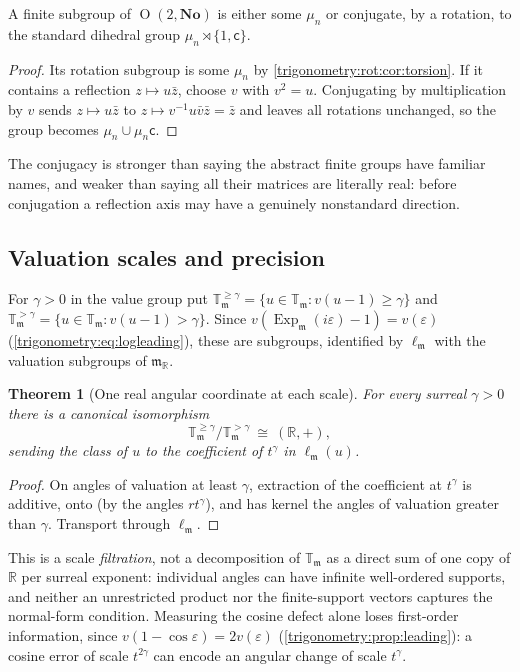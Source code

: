 \documentclass[11pt,letterpaper]{article}
\numberwithin{equation}{section}
\newtheorem{theorem}{Theorem}[section]
\theoremstyle{definition}
\theoremstyle{remark}
\newcommand{\No}{\mathbf{No}}
\newcommand{\R}{\mathbb R}
\newcommand{\mm}{\mathfrak m}
\newcommand{\TT}{\mathbb T}
\newcommand{\eps}{\varepsilon}
\newcommand{\Ex}{\operatorname{Exp}_{\mm}}
\newcommand{\Orth}{\operatorname{O}}
\newcommand{\ellm}{\ell_{\mm}}
\newcommand{\Tm}{\TT_{\mm}}
\begin{document}
\begin{proposition}\label{trigonometry:rot:prop:dihedral}
A finite subgroup of $\Orth(2,\No)$ is either some $\mu_n$ or conjugate, by a rotation, to the
standard dihedral group $\mu_n\rtimes\{1,\mathsf c\}$.
\end{proposition}
\begin{proof}
Its rotation subgroup is some $\mu_n$ by \cref{trigonometry:rot:cor:torsion}. If it contains a
reflection $z\mapsto u\bar z$, choose $v$ with $v^2=u$. Conjugating by multiplication by $v$ sends
$z\mapsto u\bar z$ to $z\mapsto v^{-1}u\bar v\bar z=\bar z$ and leaves all rotations unchanged, so the
group becomes $\mu_n\cup\mu_n\mathsf c$.
\end{proof}
The conjugacy is stronger than saying the abstract finite groups have familiar names, and weaker
than saying all their matrices are literally real: before conjugation a reflection axis may have a
genuinely nonstandard direction.

\subsection{Valuation scales and precision}\label{trigonometry:rot:sec:scales}
For $\gamma>0$ in the value group put
$\Tm^{\ge\gamma}=\{u\in\Tm:v(u-1)\ge\gamma\}$ and $\Tm^{>\gamma}=\{u\in\Tm:v(u-1)>\gamma\}$. Since
$v(\Ex(i\eps)-1)=v(\eps)$ (\cref{trigonometry:eq:logleading}), these are subgroups, identified by
$\ellm$ with the valuation subgroups of $\mm_{\R}$.

\begin{theorem}[One real angular coordinate at each scale]\label{trigonometry:rot:thm:graded}
For every surreal $\gamma>0$ there is a canonical isomorphism
\begin{equation}\label{trigonometry:rot:eq:graded}
 \Tm^{\ge\gamma}/\Tm^{>\gamma}\ \cong\ (\R,+),
\end{equation}
sending the class of $u$ to the coefficient of $t^\gamma$ in $\ellm(u)$.
\end{theorem}
\begin{proof}
On angles of valuation at least $\gamma$, extraction of the coefficient at $t^\gamma$ is additive,
onto (by the angles $rt^\gamma$), and has kernel the angles of valuation greater than $\gamma$.
Transport through $\ellm$.
\end{proof}
This is a scale \emph{filtration}, not a decomposition of $\Tm$ as a direct sum of one copy of $\R$
per surreal exponent: individual angles can have infinite well-ordered supports, and neither an
unrestricted product nor the finite-support vectors captures the normal-form condition. Measuring the
cosine defect alone loses first-order information, since $v(1-\cos\eps)=2v(\eps)$
(\cref{trigonometry:prop:leading}): a cosine error of scale $t^{2\gamma}$ can encode an angular change
of scale $t^\gamma$.
\end{document}
